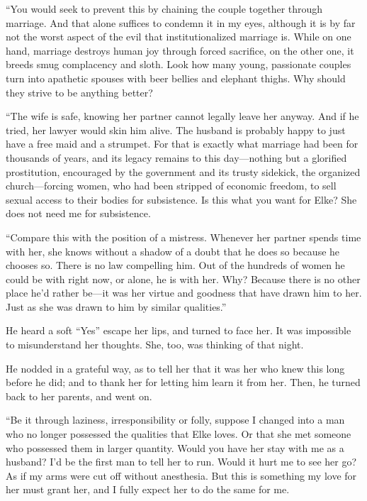 ``You would seek to prevent this by chaining the couple together through marriage. And that alone suffices to condemn it in my eyes, although it is by far not the worst aspect of the evil that institutionalized marriage is. While on one hand, marriage destroys human joy through forced sacrifice, on the other one, it breeds smug complacency and sloth. Look how many young, passionate couples turn into apathetic spouses with beer bellies and elephant thighs. Why should they strive to be anything better?

``The wife is safe, knowing her partner cannot legally leave her anyway. And if he tried, her lawyer would skin him alive. The husband is probably happy to just have a free maid and a strumpet. For that is exactly what marriage had been for thousands of years, and its legacy remains to this day---nothing but a glorified prostitution, encouraged by the government and its trusty sidekick, the organized church---forcing women, who had been stripped of economic freedom, to sell sexual access to their bodies for subsistence. Is this what you want for Elke? She does not need me for subsistence.

``Compare this with the position of a mistress. Whenever her partner spends time with her, she knows without a shadow of a doubt that he does so because he chooses so. There is no law compelling him. Out of the hundreds of women he could be with right now, or alone, he is with her. Why? Because there is no other place he'd rather be---it was her virtue and goodness that have drawn him to her. Just as she was drawn to him by similar qualities.''

He heard a soft ``Yes'' escape her lips, and turned to face her. It was impossible to misunderstand her thoughts. She, too, was thinking of that night.

He nodded in a grateful way, as to tell her that it was her who knew this long before he did; and to thank her for letting him learn it from her. Then, he turned back to her parents, and went on.

``Be it through laziness, irresponsibility or folly, suppose I changed into a man who no longer possessed the qualities that Elke loves. Or that she met someone who possessed them in larger quantity. Would you have her stay with me as a husband? I'd be the first man to tell her to run. Would it hurt me to see her go? As if my arms were cut off without anesthesia. But this is something my love for her must grant her, and I fully expect her to do the same for me.


